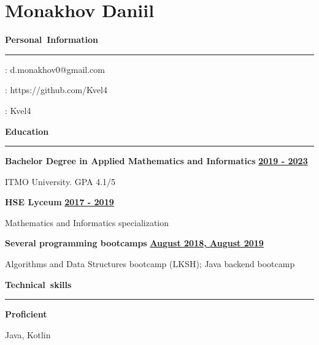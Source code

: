 \documentclass[11pt,a4paper]{report}
\author{Monakhov Daniil}
\begin{document}
\section*{\huge{Monakhov Daniil}}

\par\hbox{\Large\textbf{Personal Information}}\kern3pt\hrule
\begin{multicols}{2}

\hspace{5px}
\Letter: d.monakhov0@gmail.com




\hspace{5px}
\faGithub:  https://github.com/Kvel4

\faSend:  Kvel4

\end{multicols}


\par\hbox{\Large\textbf{Education}}\kern5pt\hrule\kern10pt

\textbf{Bachelor Degree in Applied Mathematics and Informatics}
\hfill
\textbf{\underline{2019 - 2023}}

\vspace{5px}
\hspace{10px}
ITMO University. GPA 4.1/5   \\
\hfill

\textbf{HSE Lyceum}
\hfill
\textbf{\underline{2017 - 2019}}

\vspace{5px}
\hspace{10px}
Mathematics and Informatics specialization  \\
\hfill

\textbf{Several programming bootcamps}
\hfill
\textbf{\underline{August 2018, August 2019}}

\vspace{5px}
\hspace{10px}
 Algorithms and Data Structures bootcamp (LKSH); Java backend bootcamp\\
\hfill


\par\hbox{\Large\textbf{Technical skills}}\kern5pt\hrule
\vspace{10px}


\textbf{Proficient} 

\vspace{5px}
\hspace{10px}
Java, Kotlin
\vspace{5px}
\end{document}
